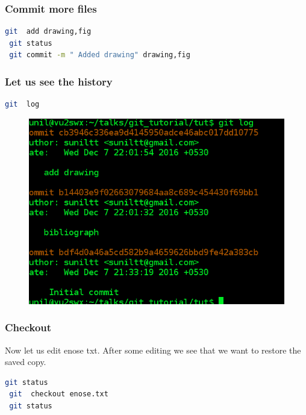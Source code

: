 \documentclass[10pt,a4paper]{beamer}
\begin{document}
\begin{frame}[fragile]
\frametitle{  Commit more files}

 
  \begin{lstlisting}[language=bash]
 git  add drawing,fig
 git status 
 git commit -m " Added drawing" drawing,fig
\end{lstlisting}

\end{frame}



\begin{frame}[fragile]
\frametitle{  Let us see the history }
 \begin{lstlisting}[language=bash]
 git  log
\end{lstlisting}
\begin{figure}
  \includegraphics[scale=.4]{11}
 \end{figure}
\end{frame}






 

\begin{frame}[fragile]
\frametitle{  Checkout}

 Now let us edit enose  txt. After some editing we see that we want to restore the saved copy.
  \begin{lstlisting}[language=bash]
 git status
 git  checkout enose.txt
 git status
\end{lstlisting}

\end{frame}
\end{document}
